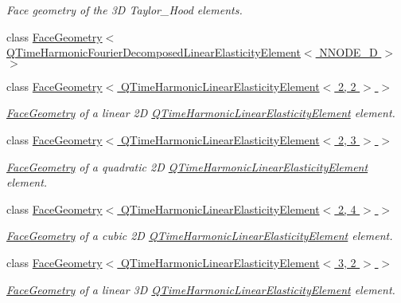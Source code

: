 \begin{DoxyCompactItemize}
\begin{DoxyCompactList}\small\item\em Face geometry of the 3D Taylor\+\_\+\+Hood elements. \end{DoxyCompactList}\item 
class \hyperlink{classoomph_1_1FaceGeometry_3_01QTimeHarmonicFourierDecomposedLinearElasticityElement_3_01NNODE__1D_01_4_01_4}{Face\+Geometry$<$ Q\+Time\+Harmonic\+Fourier\+Decomposed\+Linear\+Elasticity\+Element$<$ N\+N\+O\+D\+E\+\_\+D $>$ $>$}
\item 
class \hyperlink{classoomph_1_1FaceGeometry_3_01QTimeHarmonicLinearElasticityElement_3_012_00_012_01_4_01_4}{Face\+Geometry$<$ Q\+Time\+Harmonic\+Linear\+Elasticity\+Element$<$ 2, 2 $>$ $>$}
\begin{DoxyCompactList}\small\item\em \hyperlink{classoomph_1_1FaceGeometry}{Face\+Geometry} of a linear 2D \hyperlink{classoomph_1_1QTimeHarmonicLinearElasticityElement}{Q\+Time\+Harmonic\+Linear\+Elasticity\+Element} element. \end{DoxyCompactList}\item 
class \hyperlink{classoomph_1_1FaceGeometry_3_01QTimeHarmonicLinearElasticityElement_3_012_00_013_01_4_01_4}{Face\+Geometry$<$ Q\+Time\+Harmonic\+Linear\+Elasticity\+Element$<$ 2, 3 $>$ $>$}
\begin{DoxyCompactList}\small\item\em \hyperlink{classoomph_1_1FaceGeometry}{Face\+Geometry} of a quadratic 2D \hyperlink{classoomph_1_1QTimeHarmonicLinearElasticityElement}{Q\+Time\+Harmonic\+Linear\+Elasticity\+Element} element. \end{DoxyCompactList}\item 
class \hyperlink{classoomph_1_1FaceGeometry_3_01QTimeHarmonicLinearElasticityElement_3_012_00_014_01_4_01_4}{Face\+Geometry$<$ Q\+Time\+Harmonic\+Linear\+Elasticity\+Element$<$ 2, 4 $>$ $>$}
\begin{DoxyCompactList}\small\item\em \hyperlink{classoomph_1_1FaceGeometry}{Face\+Geometry} of a cubic 2D \hyperlink{classoomph_1_1QTimeHarmonicLinearElasticityElement}{Q\+Time\+Harmonic\+Linear\+Elasticity\+Element} element. \end{DoxyCompactList}\item 
class \hyperlink{classoomph_1_1FaceGeometry_3_01QTimeHarmonicLinearElasticityElement_3_013_00_012_01_4_01_4}{Face\+Geometry$<$ Q\+Time\+Harmonic\+Linear\+Elasticity\+Element$<$ 3, 2 $>$ $>$}
\begin{DoxyCompactList}\small\item\em \hyperlink{classoomph_1_1FaceGeometry}{Face\+Geometry} of a linear 3D \hyperlink{classoomph_1_1QTimeHarmonicLinearElasticityElement}{Q\+Time\+Harmonic\+Linear\+Elasticity\+Element} element. \end{DoxyCompactList}\item 

\end{DoxyCompactItemize}
